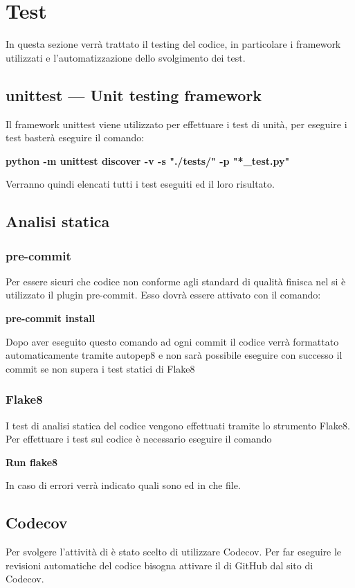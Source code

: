 \section{Test}

In questa sezione verrà trattato il testing del codice, in particolare i framework utilizzati e l'automatizzazione dello svolgimento dei test.

\subsection{unittest — Unit testing framework}
Il framework unittest viene utilizzato per effettuare i test di unità, per eseguire i test basterà eseguire il comando: \newline{}
\centerline{ \textbf{python -m unittest discover -v -s "./tests/" -p "*\_test.py"}}\newline{}
Verranno quindi elencati tutti i test eseguiti ed il loro risultato.

\subsection{Analisi statica}
\subsubsection{pre-commit}
Per essere sicuri che codice non conforme agli standard di qualità finisca nel  si è utilizzato il plugin pre-commit. Esso dovrà essere attivato con il comando: \newline{}
\centerline{\textbf{pre-commit install}}\newline{}
Dopo aver eseguito questo comando ad ogni commit il codice verrà formattato automaticamente tramite autopep8 e non sarà possibile eseguire con successo il commit se non supera i test statici di Flake8
\subsubsection{Flake8}
I test di analisi statica del codice vengono effettuati tramite lo strumento Flake8. Per effettuare i test sul codice è necessario eseguire il comando\newline{}
\centerline{\textbf{Run flake8}}\newline{}
In caso di errori verrà indicato quali sono ed in che file.

\subsection{Codecov}
Per svolgere l'attività di  è stato scelto di utilizzare Codecov. Per far eseguire le revisioni automatiche del codice bisogna attivare il  di GitHub dal sito di Codecov.

